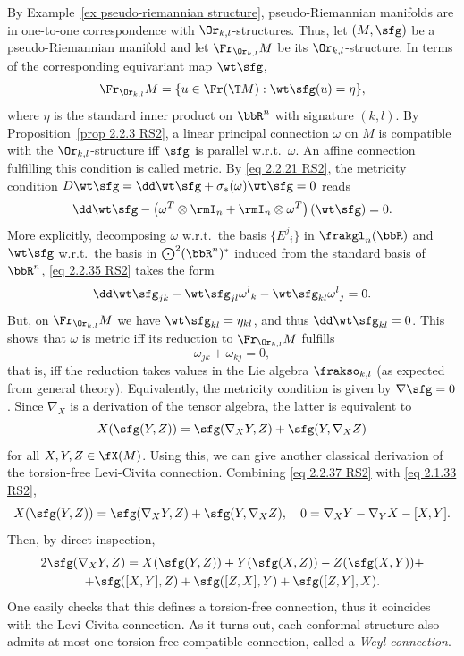 

\begin{example}
    By Example~\ref{ex pseudo-riemannian structure}, pseudo-Riemannian manifolds are in one-to-one correspondence with $\Or_{k,l}$-structures. Thus, let $(M,\sfg)$ be a pseudo-Riemannian manifold and let $\Fr_{\Or_{k,l}} M$ be its $\Or_{k,l}$-structure. In terms of the corresponding equivariant map $\wt\sfg$, 
    \[\Fr_{\Or_{k,l}}M=\{u \in\Fr(\T M):\wt\sfg(u)=\eta\},\]
    where $\eta$ is the standard inner product on $\bbR^n$ with signature $(k,l)$. By Proposition~\ref{prop 2.2.3 RS2}, a linear principal connection $\omega$ on $M$ is compatible with the $\Or_{k,l}$-structure iff $\sfg$ is parallel w.r.t.\ $\omega$. An affine connection fulfilling this condition is called metric. By \eqref{eq 2.2.21 RS2}, the metricity condition $D\wt\sfg=\dd\wt\sfg+\sigma_\ast(\omega)\wt\sfg=0$ reads 
    \[\dd\wt\sfg-\left(\omega^T\otimes \rmI_n+\rmI_n\otimes \omega^T\right)(\wt\sfg)=0.\label{eq 2.2.35 RS2}\]
    More explicitly, decomposing $\omega$ w.r.t.\ the basis $\{E^j{}_i\}$ in $\frakgl_n(\bbR)$ and $\wt\sfg$ w.r.t.\ the basis in $\bigodot\nolimits^2(\bbR^n)^\ast$ induced from the standard basis of $\bbR^n$, \eqref{eq 2.2.35 RS2} takes the form 
    \[\dd \wt\sfg_{jk}-\wt\sfg_{jl}\omega^l{}_k-\wt\sfg_{kl}\omega^l{}_j=0.\]
    But, on $\Fr_{\Or_{k,l}} M$ we have $\wt\sfg_{kl}=\eta_{kl}$, and thus $\dd\wt\sfg_{kl}=0$. This shows that $\omega$ is metric iff its reduction to $\Fr_{\Or_{k,l}}M$ fulfills 
    \[\omega_{jk}+\omega_{kj}=0,\]
    that is, iff the reduction takes values in the Lie algebra $\frakso_{k,l}$ (as expected from general theory). Equivalently, the metricity condition is given by $\nabla\sfg=0$. Since $\nabla_X$ is a derivation of the tensor algebra, the latter is equivalent to 
    \[X(\sfg(Y,Z))=\sfg(\nabla_X Y,Z)+\sfg(Y,\nabla_X Z)\label{eq 2.2.37 RS2}\]
    for all $X,Y,Z\in\fX(M)$. Using this, we can give another classical derivation of the torsion-free Levi-Civita connection. Combining \eqref{eq 2.2.37 RS2} with \eqref{eq 2.1.33 RS2}, 
    \[X(\sfg(Y,Z))=\sfg(\nabla_X Y,Z)+\sfg(Y,\nabla_X Z),\quad 0=\nabla_X Y-\nabla_Y X-[X,Y].\]
    Then, by direct inspection,
    \begin{multline}
        2\sfg(\nabla_X Y,Z)=X(\sfg(Y,Z))+Y(\sfg(X,Z))-Z(\sfg(X,Y))+\\
        +\sfg([X,Y],Z)+\sfg([Z,X],Y)+\sfg([Z,Y],X).\label{eq 2.2.40 RS2}
    \end{multline}
    One easily checks that this defines a torsion-free connection, thus it coincides with the Levi-Civita connection.  As it turns out, each conformal structure also admits at most one torsion-free compatible connection, called a \emph{Weyl connection}.
\end{example}


